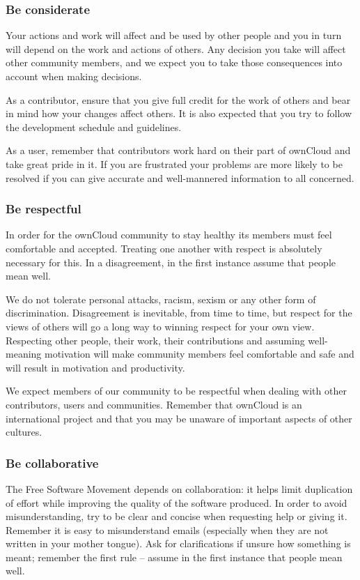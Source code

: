 \documentclass[letterpaper,10pt,english]{sphinxmanual}
\begin{document}
\subsubsection{Be considerate}
\label{general/code-of-conduct:be-considerate}
Your actions and work will affect and be used by other people and you in turn will depend on the work and actions of others. Any decision you take will affect other community members, and we expect you to take those consequences into account when making decisions.

As a contributor, ensure that you give full credit for the work of others and bear in mind how your changes affect others. It is also expected that you try to follow the development schedule and guidelines.

As a user, remember that contributors work hard on their part of ownCloud and take great pride in it. If you are frustrated your problems are more likely to be resolved if you can give accurate and well-mannered information to all concerned.


\subsubsection{Be respectful}
\label{general/code-of-conduct:be-respectful}
In order for the ownCloud community to stay healthy its members must feel comfortable and accepted. Treating one another with respect is absolutely necessary for this. In a disagreement, in the first instance assume that people mean well.

We do not tolerate personal attacks, racism, sexism or any other form of discrimination. Disagreement is inevitable, from time to time, but respect for the views of others will go a long way to winning respect for your own view. Respecting other people, their work, their contributions and assuming well-meaning motivation will make community members feel comfortable and safe and will result in motivation and productivity.

We expect members of our community to be respectful when dealing with other contributors, users and communities. Remember that ownCloud is an international project and that you may be unaware of important aspects of other cultures.


\subsubsection{Be collaborative}
\label{general/code-of-conduct:be-collaborative}
The Free Software Movement depends on collaboration: it helps limit duplication of effort while improving the quality of the software produced. In order to avoid misunderstanding, try to be clear and concise when requesting help or giving it. Remember it is easy to misunderstand emails (especially when they are not written in your mother tongue). Ask for clarifications if unsure how something is meant; remember the first rule – assume in the first instance that people mean well.
\end{document}
